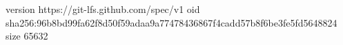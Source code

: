 version https://git-lfs.github.com/spec/v1
oid sha256:96b8bd99fa62f8d50f59adaa9a77478436867f4cadd57b8f6be3fe5fd5648824
size 65632
